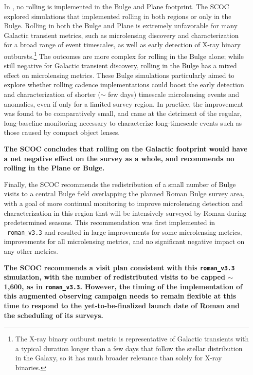 In , no rolling is implemented in the Bulge and Plane footprint. The SCOC explored simulations that implemented rolling in both regions or only in the Bulge.
Rolling in both the Bulge and Plane is extremely unfavorable for many Galactic transient metrics, such as microlensing discovery and characterization for a broad range of event timescales, as well as early detection of X-ray binary outbursts.\footnote{The X-ray binary outburst metric is representative of Galactic transients with a typical duration longer than a few days that follow the stellar distribution in the Galaxy, so it has much broader relevance than solely for X-ray binaries.} The outcomes are more complex for rolling in the Bulge alone; while still negative for Galactic transient discovery, rolling in the Bulge has a mixed effect on microlensing metrics. These Bulge simulations particularly aimed to explore whether rolling cadence implementations could boost the early detection and characterization of shorter (\mbox{$\sim$} few days) timescale microlensing events and anomalies, even if only for a limited survey region. In practice, the improvement was found to be comparatively small, and came at the detriment of the regular, long-baseline monitoring necessary to characterize long-timescale events such as those caused by compact object lenses.   


{\bf The SCOC concludes that rolling on the Galactic footprint would have a net negative effect on the survey as a whole, and recommends no rolling in the Plane or Bulge.}

Finally, the SCOC recommends the redistribution of a small number of Bulge visits to 
a central Bulge field overlapping the planned Roman Bulge survey area, with a goal of more continual monitoring to improve microlensing detection and characterization in this region that will be intensively surveyed by Roman during predetermined seasons.
This recommendation was first implemented in \opsim\ \texttt{roman\_v3.3} and resulted in large improvements for some microlensing metrics, improvements for all microlensing metrics, and no significant negative impact on any other metrics. 

{\bf The SCOC recommends a visit plan consistent with this \texttt{roman\_v3.3} simulation, with the number of redistributed visits to be capped \mbox{$\sim$1,600}, as in  \texttt{roman\_v3.3}. However, the timing of the implementation of this augmented observing campaign needs to remain flexible at this time to respond to the yet-to-be-finalized launch date of Roman and the scheduling of its surveys.}


